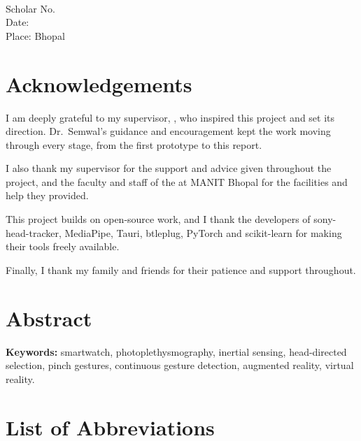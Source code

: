 \vspace{2.5cm}
\noindent\authorName\\
Scholar No.\ \scholarNo\\
Date: \\
Place: Bhopal

\chapter*{Acknowledgements}

I am deeply grateful to my supervisor, \supervisorA, who inspired this project and set its direction. Dr.\ Semwal's guidance and encouragement kept the work moving through every stage, from the first prototype to this report.

I also thank my supervisor \supervisorB{} for the support and advice given throughout the project, and the faculty and staff of the \department{} at MANIT Bhopal for the facilities and help they provided.

This project builds on open-source work, and I thank the developers of sony-head-tracker, MediaPipe, Tauri, btleplug, PyTorch and scikit-learn for making their tools freely available.

Finally, I thank my family and friends for their patience and support throughout.

\vspace{1.5cm}
\noindent\authorName

\chapter*{Abstract}


\vspace{1em}
\noindent\textbf{Keywords:} smartwatch, photoplethysmography, inertial sensing, head-directed selection, pinch gestures, continuous gesture detection, augmented reality, virtual reality.

\tableofcontents
\listoffigures
\listoftables

\chapter*{List of Abbreviations}

